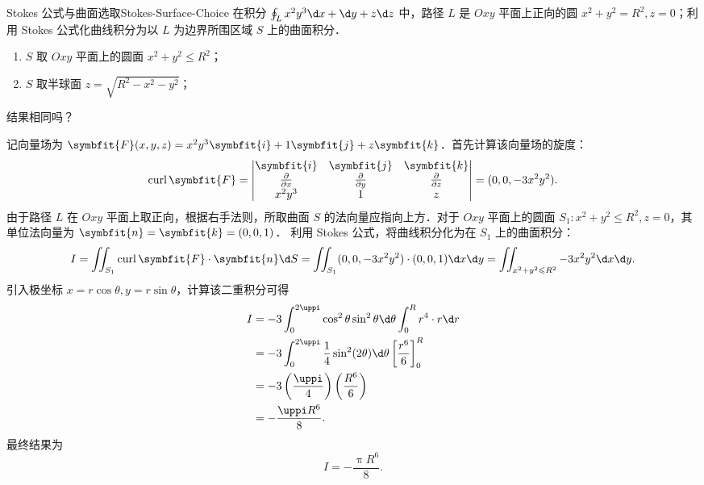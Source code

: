 \begin{problem}{Stokes 公式与曲面选取}{Stokes-Surface-Choice}
    在积分 $\oint_L x^2 y^3 \d x + \d y + z \d z$ 中，路径 $L$ 是 $Oxy$ 平面上正向的圆 $x^2+y^2=R^2, z=0$；利用 Stokes 公式化曲线积分为以 $L$ 为边界所围区域 $S$ 上的曲面积分．
    \begin{enumerate}
        \item $S$ 取 $Oxy$ 平面上的圆面 $x^2+y^2 \leqslant R^2$；
        \item $S$ 取半球面 $z = \sqrt{R^2-x^2-y^2}$；
    \end{enumerate}
    结果相同吗？
\end{problem}

\begin{solution}

    记向量场为 $\symbfit{F}(x,y,z) = x^2 y^3 \symbfit{i} + 1 \symbfit{j} + z \symbfit{k}$．首先计算该向量场的旋度：
    \begin{equation}
        \label{eq:curl-F}
        \operatorname{curl} \symbfit{F} = \left| \begin{matrix} \symbfit{i} & \symbfit{j} & \symbfit{k} \\ \frac{\partial}{\partial x} & \frac{\partial}{\partial y} & \frac{\partial}{\partial z} \\ x^2 y^3 & 1 & z \end{matrix} \right| = (0, 0, -3x^2 y^2).
    \end{equation}
    由于路径 $L$ 在 $Oxy$ 平面上取正向，根据右手法则，所取曲面 $S$ 的法向量应指向上方．对于 $Oxy$ 平面上的圆面 $S_1 \colon x^2+y^2 \leqslant R^2, z=0$，其单位法向量为 $\symbfit{n} = \symbfit{k} = (0,0,1)$．
    利用 Stokes 公式，将曲线积分化为在 $S_1$ 上的曲面积分：
    \begin{equation}
        \label{eq:stokes-S1}
        I = \iint_{S_1} \operatorname{curl} \symbfit{F} \cdot \symbfit{n} \d S = \iint_{S_1} (0, 0, -3x^2 y^2) \cdot (0, 0, 1) \d x \d y = \iint_{x^2+y^2 \leqslant R^2} -3x^2 y^2 \d x \d y.
    \end{equation}
    引入极坐标 $x = r \cos \theta, y = r \sin \theta$，计算该二重积分可得
    \begin{equation}
        \label{eq:eval-S1}
        \begin{aligned}
            I & = -3 \int_0^{2\uppi} \cos^2 \theta \sin^2 \theta \d \theta \int_0^R r^4 \cdot r \d r        \\
              & = -3 \int_0^{2\uppi} \frac{1}{4} \sin^2(2\theta) \d \theta \left[ \frac{r^6}{6} \right]_0^R \\
              & = -3 \left( \frac{\uppi}{4} \right) \left( \frac{R^6}{6} \right)                            \\
              & = -\frac{\uppi R^6}{8}.
        \end{aligned}
    \end{equation}
    最终结果为
    \begin{equation}
        \label{eq:res-1-1}
        \boxed{I = -\frac{\uppi R^6}{8}}.
    \end{equation}


\end{solution}
